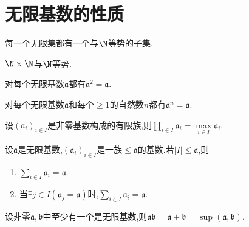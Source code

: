 \section{无限基数的性质}

\begin{lemma}{}{}
	每一个无限集都有一个与$\N$等势的子集.
\end{lemma}

\begin{lemma}{}{}
	$\N\times\N$与$\N$等势.
\end{lemma}

\begin{theorem}{}{}
	对每个无限基数$\mathfrak{a}$都有$\mathfrak{a}^{2}=\mathfrak{a}$.
\end{theorem}

\begin{corollary}{}{}
	对每个无限基数$\mathfrak{a}$和每个$\geq 1$的自然数$n$都有$\mathfrak{a}^{n}=\mathfrak{a}$.
\end{corollary}

\begin{corollary}{}{}
	设$\left(\mathfrak{a}_{i}\right)_{i\in I}$是非零基数构成的有限族,则$\prod\limits_{i\in I}\mathfrak{a}_{i}=\max\limits_{i\in I}\mathfrak{a}_{i}$.
\end{corollary}

\begin{corollary}{}{}
	设$\mathfrak{a}$是无限基数,$\left(\mathfrak{a}_{i}\right)_{i\in I}$是一族$\leq\mathfrak{a}$的基数.若$\left|I\right|\leq\mathfrak{a}$,则
	\begin{enumerate}
		\item $\sum\limits_{i\in I}\mathfrak{a}_{i}=\mathfrak{a}$.
		\item 当$\exists j\in I\left(\mathfrak{a}_{j}=\mathfrak{a}\right)$时,$\sum\limits_{i\in I}\mathfrak{a}_{i}=\mathfrak{a}$.
	\end{enumerate}
\end{corollary}

\begin{corollary}{}{}
	设非零$\mathfrak{a},\mathfrak{b}$中至少有一个是无限基数,则$\mathfrak{a}\mathfrak{b}=\mathfrak{a}+\mathfrak{b}=\sup\left(\mathfrak{a},\mathfrak{b}\right)$.
\end{corollary}

























